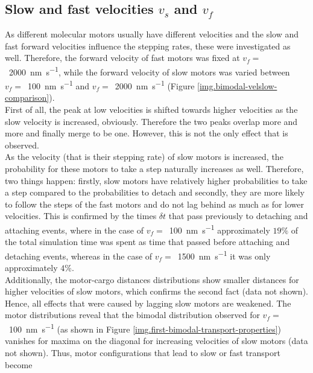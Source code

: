 \subsection{Slow and fast velocities $v_s$ and $v_f$}\label{ss.slow-and-fast-velocities}
As different molecular motors usually have different velocities and the slow and fast forward velocities influence the stepping rates, these were investigated as well. Therefore, the forward
velocity of fast motors was fixed at \mbox{$v_f =$ \SI[per-mode=fraction]{2000}{\nano\metre\per\second}}, while the forward velocity of slow motors was varied between 
\mbox{$v_f =$ \SI[per-mode=fraction]{100}{\nano\metre\per\second}} and \mbox{$v_f =$ \SI[per-mode=fraction]{2000}{\nano\metre\per\second}} (Figure \ref{img.bimodal-velslow-comparison}). \\
First of all, the peak at low velocities is shifted towards higher velocities as the slow velocity is increased, obviously. Therefore the two peaks overlap more and more and finally merge to be
one. However, this is not the only effect that is observed. \\
As the velocity (that is their stepping rate) of slow motors is increased, the probability for these motors to take a step naturally increases as well. Therefore, two things happen: firstly, slow
motors have relatively higher probabilities to take a step compared to the probabilities to detach and secondly, they are more likely to follow the steps of the fast motors and do not lag behind as
much as for lower velocities. This is confirmed by the times $\delta t$ that pass previously to detaching and attaching events, where in the case of
\mbox{$v_f =$ \SI[per-mode=fraction]{100}{\nano\metre\per\second}} approximately \mbox{$19\%$} of the total simulation time was spent as time that passed before attaching and detaching events,
whereas in the case of \mbox{$v_f =$ \SI[per-mode=fraction]{1500}{\nano\metre\per\second}} it was only approximately \mbox{$4\%$}. \\
Additionally, the motor-cargo distances distributions show smaller distances for higher velocities of slow motors, which confirms the second fact (data not shown). Hence, all effects that were caused by lagging slow
motors are weakened. The motor distributions reveal that the bimodal distribution observed for \mbox{$v_f =$ \SI[per-mode=fraction]{100}{\nano\metre\per\second}} (as shown in Figure
\ref{img.first-bimodal-transport-properties}) vanishes for maxima on the diagonal for increasing velocities of slow motors (data not shown). Thus, motor configurations that lead to slow or fast transport become
